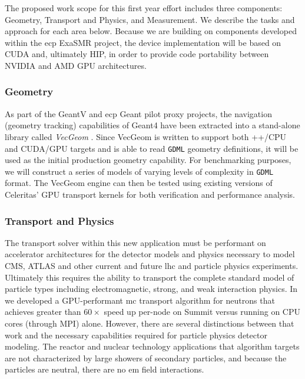 \documentclass[10pt]{article}
\begin{document}
The proposed work scope for this first year effort includes three
components: Geometry, Transport and Physics, and Measurement. We
describe the tasks and approach for each area below. Because we are
building on components developed within the \ac{ecp} ExaSMR project, the
device implementation will be based on CUDA and, ultimately HIP, in
order to provide code portability between NVIDIA and AMD GPU
architectures.

\subsubsection*{Geometry}

As part of the GeantV and \ac{ecp} Geant pilot proxy projects, the navigation
(geometry tracking) capabilities of Geant4 have been extracted into a
stand-alone library called \emph{VecGeom} \cite{apostolakis_towards_2015}.
Since VecGeom is written to support both \C++/CPU and CUDA/GPU targets
and is able to read \texttt{GDML} geometry definitions, it will be used
as the initial production geometry capability. For benchmarking
purposes, we will construct a series of models of varying levels of
complexity in \texttt{GDML} format. The VecGeom engine can then be
tested using existing versions of Celeritas' GPU transport kernels for both
verification and performance analysis. 

\subsubsection*{Transport and Physics}

The transport solver within this new application must be performant on
accelerator architectures for the detector models and physics necessary
to model CMS, ATLAS and other current and future \ac{lhc} and particle
physics experiments. Ultimately this requires the ability to transport
the complete standard model of particle types including electromagnetic,
strong, and weak interaction physics. In \textcite{hamilton_continuous-energy_2019} we
developed a GPU-performant \ac{mc} transport algorithm for neutrons that
achieves greater than $60\times$ speed up per-node on Summit versus
running on CPU cores (through MPI) alone. However, there are several
distinctions between that work and the necessary capabilities required
for particle physics detector modeling. The reactor and nuclear
technology applications that algorithm targets are not characterized by
large showers of secondary particles, and because the particles are
neutral, there are no \ac{em} field interactions.
\end{document}
